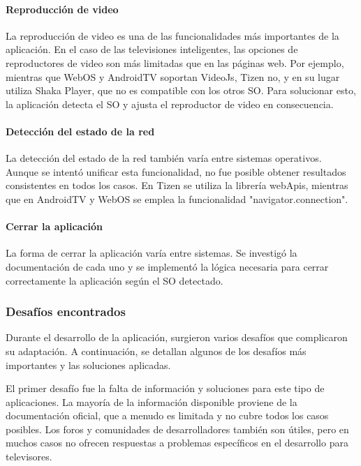 \paragraph{Reproducción de video}
La reproducción de video es una de las funcionalidades más importantes de la aplicación. En el caso de las televisiones inteligentes, 
las opciones de reproductores de video son más limitadas que en las páginas web. Por ejemplo, mientras que WebOS y AndroidTV 
soportan VideoJs, Tizen no, y en su lugar utiliza Shaka Player, que no es compatible con los otros SO. Para solucionar esto, 
la aplicación detecta el SO y ajusta el reproductor de video en consecuencia.

\paragraph{Detección del estado de la red}
La detección del estado de la red también varía entre sistemas operativos. Aunque se intentó unificar esta funcionalidad, 
no fue posible obtener resultados consistentes en todos los casos. En Tizen se utiliza la librería webApis, mientras que en 
AndroidTV y WebOS se emplea la funcionalidad "navigator.connection".

\paragraph{Cerrar la aplicación}
La forma de cerrar la aplicación varía entre sistemas. Se investigó la documentación de cada uno y se implementó 
la lógica necesaria para cerrar correctamente la aplicación según el SO detectado.

\subsubsection{Desafíos encontrados}
\label{sec:desafios}

Durante el desarrollo de la aplicación, surgieron varios desafíos que complicaron su adaptación. A continuación, 
se detallan algunos de los desafíos más importantes y las soluciones aplicadas.

El primer desafío fue la falta de información y soluciones para este tipo de aplicaciones. La mayoría de la información 
disponible proviene de la documentación oficial, que a menudo es limitada y no cubre todos los casos posibles. 
Los foros y comunidades de desarrolladores también son útiles, pero en muchos casos no ofrecen respuestas a 
problemas específicos en el desarrollo para televisores.

